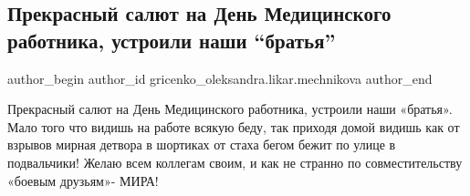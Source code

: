  
 
 
 
 

\subsection{Прекрасный салют на День Медицинского работника, устроили наши \enquote{братья}}
\label{sec:18_06_2022.fb.gricenko_oleksandra.likar.mechnikova.1.prekrasnii_salyut_na}

\ifcmt
 author_begin
   author_id gricenko_oleksandra.likar.mechnikova
 author_end
\fi

Прекрасный салют на День Медицинского работника, устроили наши «братья».  Мало
того что видишь на работе всякую беду, так приходя домой видишь как от взрывов
мирная детвора в шортиках от стаха бегом бежит по улице в подвальчики!  Желаю
всем коллегам своим, и как не странно по совместительству «боевым друзьям»-
МИРА!
